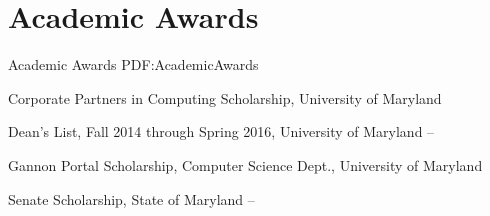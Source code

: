 
\section
{Academic Awards}
{Academic Awards}
{PDF:AcademicAwards}

\BulletItem
Corporate Partners in Computing Scholarship,
University of Maryland
\hfill
{}

\GapNoBreak
\BulletItem
Dean's List,
Fall 2014 through Spring 2016,
University of Maryland
\hfill
{} --

\GapNoBreak
\BulletItem
Gannon Portal Scholarship,
Computer Science Dept., 
University of Maryland
\hfill
{}

\GapNoBreak
\BulletItem
Senate Scholarship,
State of Maryland
\hfill
{} --
\Gap
